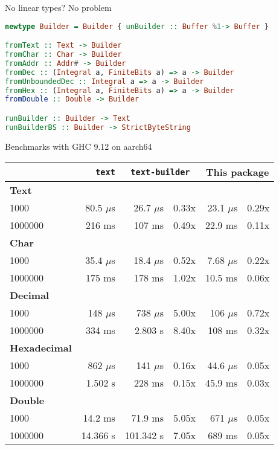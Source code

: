 \documentclass[handout]{beamer}
\begin{document}
\begin{frame}[fragile]{No linear types? No problem}

\begin{lstlisting}[language=Haskell]
newtype Builder = Builder { unBuilder :: Buffer %1-> Buffer }

fromText :: Text -> Builder
fromChar :: Char -> Builder
fromAddr :: Addr# -> Builder
fromDec :: (Integral a, FiniteBits a) => a -> Builder
fromUnboundedDec :: Integral a => a -> Builder
fromHex :: (Integral a, FiniteBits a) => a -> Builder
fromDouble :: Double -> Builder

runBuilder :: Builder -> Text
runBuilderBS :: Builder -> StrictByteString
\end{lstlisting}

\end{frame}

\begin{frame}[fragile]{Benchmarks with GHC 9.12 on aarch64}

\begin{longtable}[]{@{}lrrrrr@{}}
~ & \texttt{text} & \multicolumn{2}{c}{\texttt{text-builder}} & \multicolumn{2}{c}{This package}
\\
\endhead
\endlastfoot
\textbf{Text} & & & & & \\
1000 & 80.5 $\mu$s & 26.7 $\mu$s & 0.33x & 23.1 $\mu$s & 0.29x \\
1000000 & 216 ms & 107 ms & 0.49x & 22.9 ms & 0.11x \\
\textbf{Char} & & & & & \\
1000 & 35.4 $\mu$s & 18.4 $\mu$s & 0.52x & 7.68 $\mu$s & 0.22x \\
1000000 & 175 ms & 178 ms & 1.02x & 10.5 ms & 0.06x \\
\textbf{Decimal} & & & & & \\
1000 & 148 $\mu$s & 738 $\mu$s & 5.00x & 106 $\mu$s & 0.72x \\
1000000 & 334 ms & 2.803 s & 8.40x & 108 ms & 0.32x \\
\textbf{Hexadecimal} & & & & & \\
1000 & 862 $\mu$s & 141 $\mu$s & 0.16x & 44.6 $\mu$s & 0.05x \\
1000000 & 1.502 s & 228 ms & 0.15x & 45.9 ms & 0.03x \\
\textbf{Double} & & & & & \\
1000 & 14.2 ms & 71.9 ms & 5.05x & 671 $\mu$s & 0.05x \\
1000000 & 14.366 s & 101.342 s & 7.05x & 689 ms & 0.05x \\
\end{longtable}

\end{frame}
\end{document}

